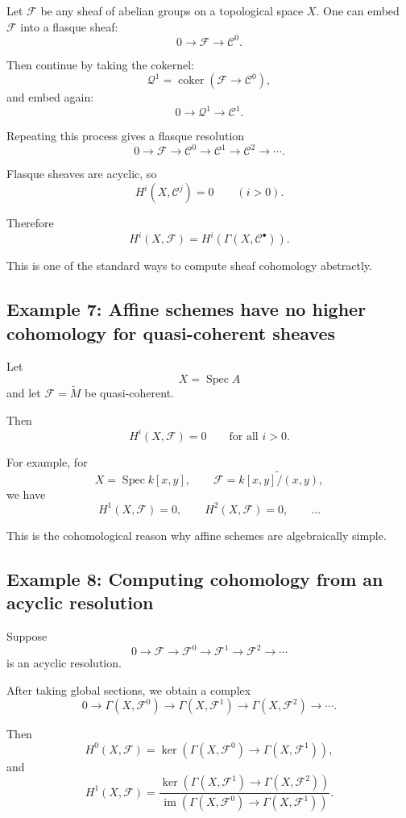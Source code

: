 \documentclass[12pt,a4paper]{article}
\theoremstyle{notespace}
\begin{document}
Let \(\mathcal F\) be any sheaf of abelian groups on a topological space \(X\). One can embed \(\mathcal F\) into a flasque sheaf:
\[
0\to \mathcal F\to \mathcal C^0.
\]

Then continue by taking the cokernel:
\[
\mathcal Q^1=\operatorname{coker}(\mathcal F\to \mathcal C^0),
\]
and embed again:
\[
0\to \mathcal Q^1\to \mathcal C^1.
\]

Repeating this process gives a flasque resolution
\[
0\to \mathcal F
\to \mathcal C^0
\to \mathcal C^1
\to \mathcal C^2
\to \cdots .
\]

Flasque sheaves are acyclic, so
\[
H^i(X,\mathcal C^j)=0
\qquad
(i>0).
\]

Therefore
\[
H^i(X,\mathcal F)
=
H^i(\Gamma(X,\mathcal C^\bullet)).
\]

This is one of the standard ways to compute sheaf cohomology abstractly.

\subsection*{Example 7: Affine schemes have no higher cohomology for quasi-coherent sheaves}

Let
\[
X=\operatorname{Spec}A
\]
and let \(\mathcal F=\widetilde M\) be quasi-coherent.

Then
\[
H^i(X,\mathcal F)=0
\qquad
\text{for all }i>0.
\]

For example, for
\[
X=\operatorname{Spec}k[x,y],
\qquad
\mathcal F=\widetilde{k[x,y]/(x,y)},
\]
we have
\[
H^1(X,\mathcal F)=0,
\qquad
H^2(X,\mathcal F)=0,
\qquad
\ldots
\]

This is the cohomological reason why affine schemes are algebraically simple.

\subsection*{Example 8: Computing cohomology from an acyclic resolution}

Suppose
\[
0\to \mathcal F
\to \mathcal F^0
\to \mathcal F^1
\to \mathcal F^2
\to \cdots
\]
is an acyclic resolution.

After taking global sections, we obtain a complex
\[
0\to \Gamma(X,\mathcal F^0)
\to \Gamma(X,\mathcal F^1)
\to \Gamma(X,\mathcal F^2)
\to \cdots .
\]

Then
\[
H^0(X,\mathcal F)
=
\ker\left(
\Gamma(X,\mathcal F^0)
\to
\Gamma(X,\mathcal F^1)
\right),
\]
and
\[
H^1(X,\mathcal F)
=
\frac{
	\ker\left(
	\Gamma(X,\mathcal F^1)
	\to
	\Gamma(X,\mathcal F^2)
	\right)
}{
	\operatorname{im}\left(
	\Gamma(X,\mathcal F^0)
	\to
	\Gamma(X,\mathcal F^1)
	\right)
}.
\]
\end{document}
